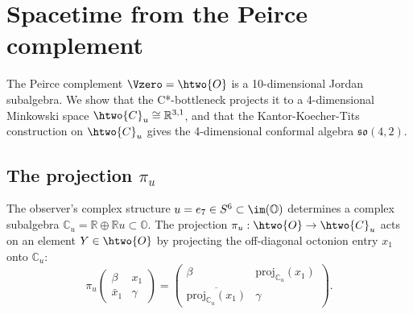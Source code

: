
\section{Spacetime from the Peirce complement}
\label{sec:spacetime}

The Peirce complement $\Vzero = \htwo{O}$ is a 10-dimensional Jordan
subalgebra. We show that the C*-bottleneck projects it to a
4-dimensional Minkowski space $\htwo{C}_u \cong \mathbb{R}^{3,1}$,
and that the Kantor-Koecher-Tits construction on $\htwo{C}_u$ gives
the 4-dimensional conformal algebra $\mathfrak{so}(4,2)$.

\subsection{The projection $\pi_u$}

The observer's complex structure $u = e_7 \in S^6 \subset \im(\mathbb{O})$
determines a complex subalgebra $\mathbb{C}_u = \mathbb{R} \oplus
\mathbb{R} u \subset \mathbb{O}$. The projection $\pi_u : \htwo{O} \to
\htwo{C}_u$ acts on an element $Y \in \htwo{O}$ by projecting the
off-diagonal octonion entry $x_1$ onto $\mathbb{C}_u$:
\begin{equation}
\label{eq:pi-u}
\pi_u \begin{pmatrix} \beta & x_1 \\ \bar{x}_1 & \gamma \end{pmatrix}
= \begin{pmatrix} \beta & \mathrm{proj}_{\mathbb{C}_u}(x_1) \\
\overline{\mathrm{proj}_{\mathbb{C}_u}(x_1)} & \gamma \end{pmatrix}.
\end{equation}

